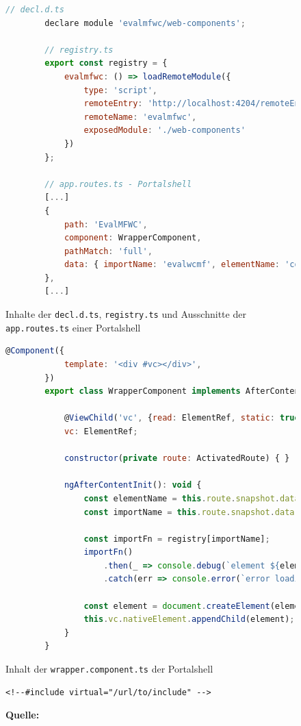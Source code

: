 \newpage
\begin{figure}[bht]
	\begin{lstlisting}[caption=Laden einer Web Component durch Module Federation, label=lst:MFPSWCConfig2, language=Javascript]
		// decl.d.ts
		declare module 'evalmfwc/web-components';
		
		// registry.ts
		export const registry = {
			evalmfwc: () => loadRemoteModule({
				type: 'script',
				remoteEntry: 'http://localhost:4204/remoteEntry.js',
				remoteName: 'evalmfwc',
				exposedModule: './web-components'
			})
		};
	
		// app.routes.ts - Portalshell
		[...]
		{
			path: 'EvalMFWC',
			component: WrapperComponent,
			pathMatch: 'full', 
			data: { importName: 'evalwcmf', elementName: 'content-component-mf' }
		},
		[...]
	\end{lstlisting}
	\footnoterule{}
	\footnotesize{Inhalte der \texttt{decl.d.ts}, \texttt{registry.ts} und Ausschnitte der \texttt{app.routes.ts} einer Portalshell}
\end{figure}

\newpage
\begin{figure}[bht]
	\begin{lstlisting}[caption=Einbindung einer Web Component durch Module Federation, label=lst:MFPSWCWrapper, language=Javascript]
		@Component({
			template: '<div #vc></div>',
		})
		export class WrapperComponent implements AfterContentInit {
			
			@ViewChild('vc', {read: ElementRef, static: true})
			vc: ElementRef;
			
			constructor(private route: ActivatedRoute) { }
			
			ngAfterContentInit(): void {
				const elementName = this.route.snapshot.data.elementName;
				const importName = this.route.snapshot.data.importName;
	
				const importFn = registry[importName];
				importFn()
					.then(_ => console.debug(`element ${elementName} loaded!`))
					.catch(err => console.error(`error loading ${elementName}:`, err));
				
				const element = document.createElement(elementName);
				this.vc.nativeElement.appendChild(element);
			}
		}
	\end{lstlisting}
	\footnoterule{}
	\footnotesize{Inhalt der \texttt{wrapper.component.ts} der Portalshell}
\end{figure}

\begin{figure}[bht]
	\begin{lstlisting}[caption=Platzhalter für SSI, label=list:SSIPlaceholder]
		<!--#include virtual="/url/to/include" -->
	\end{lstlisting}
	\footnoterule{}
	\footnotesize{\textbf{Quelle:} \cite[][61]{Geers2020}}
\end{figure}


